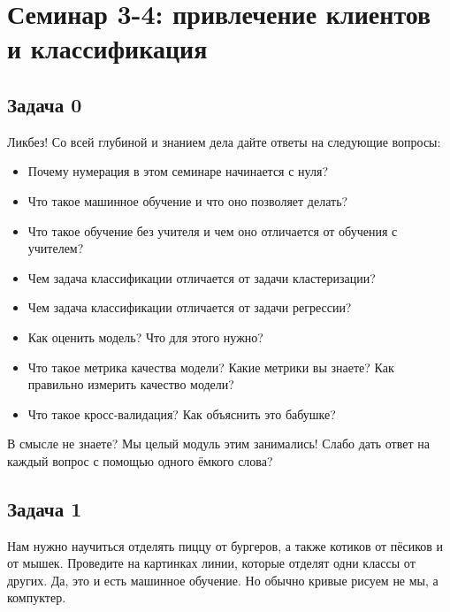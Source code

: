 \documentclass[12pt, a4paper, oneside]{article}
\begin{document}
\section*{Семинар 3-4:  привлечение клиентов и классификация}

\subsection*{Задача 0}

Ликбез!  Со всей глубиной и знанием дела дайте ответы на следующие вопросы: 

\begin{itemize}
\item  Почему нумерация в этом семинаре начинается с нуля? 
\item  Что такое машинное обучение и что оно позволяет делать? 
\item  Что такое обучение без учителя и чем оно отличается от обучения с учителем? 
\item  Чем задача классификации отличается от задачи кластеризации? 
\item  Чем задача классификации отличается от задачи регрессии? 
\item  Как оценить модель? Что для этого нужно? 
\item Что такое метрика качества модели? Какие метрики вы знаете? Как правильно измерить качество модели? 
\item Что такое кросс-валидация?  Как объяснить это бабушке? 
\end{itemize}

В смысле не знаете? Мы целый модуль этим занимались!  Слабо дать ответ на каждый вопрос с помощью одного ёмкого слова? 


\subsection*{Задача 1}

Нам нужно научиться отделять пиццу от бургеров, а также котиков от пёсиков и от мышек. Проведите на картинках линии, которые отделят одни классы от других.  Да, это и есть машинное обучение. Но обычно кривые рисуем не мы, а компуктер.
\end{document}
